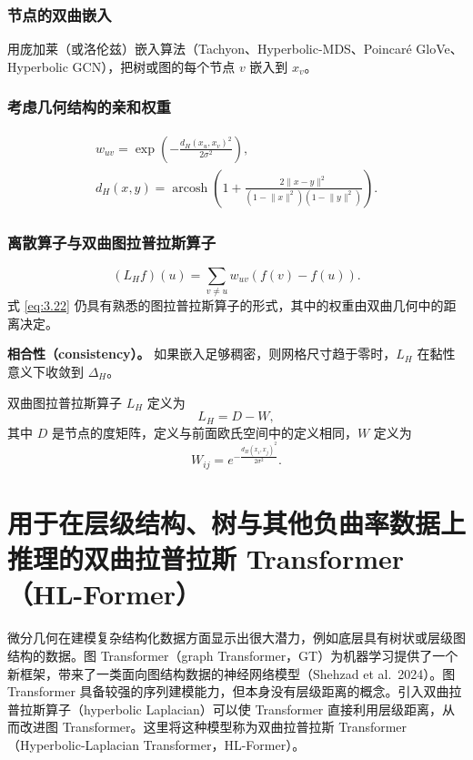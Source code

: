\subsubsection{节点的双曲嵌入}
用庞加莱（或洛伦兹）嵌入算法（Tachyon、Hyperbolic-MDS、Poincaré GloVe、Hyperbolic GCN），把树或图的每个节点 $v$ 嵌入到 $x_v$。

\subsubsection{考虑几何结构的亲和权重}
\begin{gather*}
  w_{uv}=\exp\!\left(-\frac{d_H(x_u,x_v)^2}{2\sigma^2}\right),\\
  d_H(x,y)=\operatorname{arcosh}\!
   \left(1+\frac{2\lVert x-y\rVert^2}{(1-\lVert x\rVert^2)(1-\lVert y\rVert^2)}\right).
\end{gather*}

\subsubsection{离散算子与双曲图拉普拉斯算子}
\begin{equation*}
  (L_H f)(u)=\sum_{v\ne u}w_{uv}(f(v)-f(u)).
  \tag{3.22}\label{eq:3.22}
\end{equation*}
式 \eqref{eq:3.22} 仍具有熟悉的图拉普拉斯算子的形式，其中的权重由双曲几何中的距离决定。

\textbf{相合性（consistency）。} 如果嵌入足够稠密，则网格尺寸趋于零时，$L_H$ 在黏性意义下收敛到 $\Delta_H$。

双曲图拉普拉斯算子 $L_H$ 定义为
\[
  L_H=D-W,
\]
其中 $D$ 是节点的度矩阵，定义与前面欧氏空间中的定义相同，$W$ 定义为%
%
\[
  W_{ij}=e^{-\frac{d_H(x_i,x_j)^2}{2\sigma^2}}.
\]

\section[双曲拉普拉斯 Transformer 用于层级结构与树上的推理]
  {用于在层级结构、树与其他负曲率数据上推理的双曲拉普拉斯 Transformer（HL-Former）}
\label{sec:3.13}
微分几何在建模复杂结构化数据方面显示出很大潜力，例如底层具有树状或层级图结构的数据。图 Transformer（graph Transformer，GT）为机器学习提供了一个新框架，带来了一类面向图结构数据的神经网络模型（Shehzad et al.\ 2024）。图 Transformer 具备较强的序列建模能力，但本身没有层级距离的概念。引入双曲拉普拉斯算子（hyperbolic Laplacian）可以使 Transformer 直接利用层级距离，从而改进图 Transformer。这里将这种模型称为双曲拉普拉斯 Transformer（Hyperbolic-Laplacian Transformer，HL-Former）。

